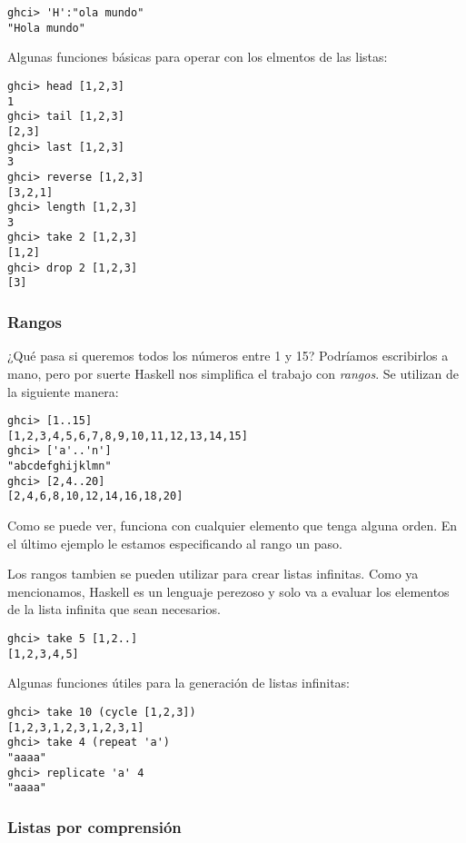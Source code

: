 \begin{lstlisting}
ghci> 'H':"ola mundo"
"Hola mundo"
\end{lstlisting}

Algunas funciones básicas para operar con los elmentos de las listas:

\begin{lstlisting}
ghci> head [1,2,3]
1
ghci> tail [1,2,3]
[2,3]
ghci> last [1,2,3]
3
ghci> reverse [1,2,3]
[3,2,1]
ghci> length [1,2,3]
3
ghci> take 2 [1,2,3]
[1,2]
ghci> drop 2 [1,2,3]
[3]
\end{lstlisting}

\subsubsection{Rangos} %
\label{ssub:rangos}

¿Qué pasa si queremos todos los números entre 1 y 15? Podríamos escribirlos a mano, pero por suerte Haskell nos simplifica el trabajo con \textit{rangos}. Se utilizan de la siguiente manera:

\begin{lstlisting}
ghci> [1..15]
[1,2,3,4,5,6,7,8,9,10,11,12,13,14,15]
ghci> ['a'..'n']
"abcdefghijklmn"
ghci> [2,4..20]
[2,4,6,8,10,12,14,16,18,20]
\end{lstlisting}

Como se puede ver, funciona con cualquier elemento que tenga alguna orden. En el último ejemplo le estamos especificando al rango un paso.

Los rangos tambien se pueden utilizar para crear listas infinitas. Como ya mencionamos, Haskell es un lenguaje perezoso y solo va a evaluar los elementos de la lista infinita que sean necesarios.

\begin{lstlisting}
ghci> take 5 [1,2..]
[1,2,3,4,5]
\end{lstlisting}

Algunas funciones útiles para la generación de listas infinitas:

\begin{lstlisting}
ghci> take 10 (cycle [1,2,3])
[1,2,3,1,2,3,1,2,3,1]
ghci> take 4 (repeat 'a')
"aaaa"
ghci> replicate 'a' 4
"aaaa"
\end{lstlisting}

\subsubsection{Listas por comprensión} %
\label{ssub:listas_por_comprensi_n}

